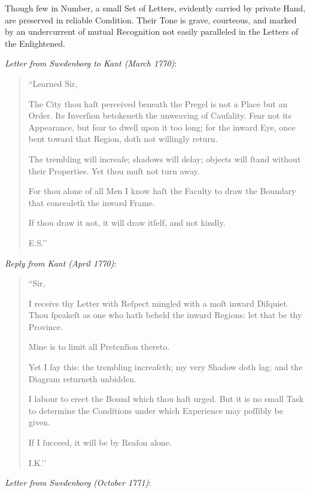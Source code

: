 \documentclass[12pt]{book}
\begin{document}

Though few in Number, a small Set of Letters, evidently carried by private Hand, are preserved in reliable Condition. Their Tone is grave, courteous, and marked by an undercurrent of mutual Recognition not easily paralleled in the Letters of the Enlightened.

\medskip

\noindent\textit{Letter from Swedenborg to Kant (March 1770)}:

\begin{quote}
``Learned Sir,

The City thou haſt perceived beneath the Pregel is not a Place but an Order. Its Inverſion betokeneth the unweaving of Cauſality. Fear not its Appearance, but fear to dwell upon it too long; for the inward Eye, once bent toward that Region, doth not willingly return.

The trembling will increaſe; shadows will delay; objects will ſtand without their Properties. Yet thou muſt not turn away.

For thou alone of all Men I know haſt the Faculty to draw the Boundary that concealeth the inward Frame.

If thou draw it not, it will draw itſelf, and not kindly.

\hfill E.S.’’
\end{quote}

\medskip

\noindent\textit{Reply from Kant (April 1770)}:

\begin{quote}
``Sir,

I receive thy Letter with Reſpect mingled with a moſt inward Diſquiet. Thou ſpeakeſt as one who hath beheld the inward Regions: let that be thy Province.

Mine is to limit all Pretenſion thereto.

Yet I ſay this: the trembling increaſeth; my very Shadow doth lag; and the Diagram returneth unbidden.

I labour to erect the Bound which thou haſt urged. But it is no small Task to determine the Conditions under which Experience may poſſibly be given.

If I ſucceed, it will be by Reaſon alone.

\hfill I.K.’’
\end{quote}

\medskip

\noindent\textit{Letter from Swedenborg (October 1771)}:
\end{document}
